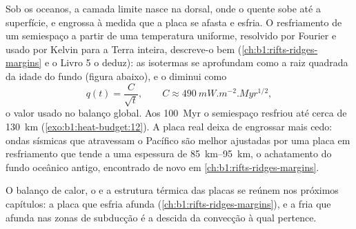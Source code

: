 Sob os oceanos, a camada limite nasce na dorsal, onde o  quente sobe
até a superfície, e engrossa à medida que a placa se afasta e esfria. O
resfriamento de um semiespaço a partir de uma temperatura uniforme, resolvido por Fourier e usado
por Kelvin para a Terra inteira, descreve-o bem (\cref{ch:b1:rifts-ridges-margins}
e o Livro 5 o deduz): as isotermas se aprofundam como a raiz quadrada da
idade do fundo (figura abaixo), e o 
diminui como
\[
  q(t) = \frac{C}{\sqrt t}, \qquad C \approx \qty{490}{mW.m^{-2}.Myr^{1/2}},
\]
o valor usado no balanço global. %
Aos \qty{100}{Myr} o semiespaço resfriou até cerca de \qty{130}{km} (\cref{exo:b1:heat-budget:12}). A placa real deixa de engrossar mais cedo: ondas sísmicas que atravessam o Pacífico
são melhor ajustadas por uma placa em resfriamento que tende a uma espessura de
\qtyrange{85}{95}{km}, o achatamento do fundo oceânico antigo, encontrado de novo em
\cref{ch:b1:rifts-ridges-margins}.

O balanço de calor, o  e a estrutura térmica das placas se reúnem
nos próximos capítulos: a placa que esfria afunda
(\cref{ch:b1:rifts-ridges-margins}), e a  fria que afunda nas
zonas de subducção é a descida da convecção à qual pertence.

